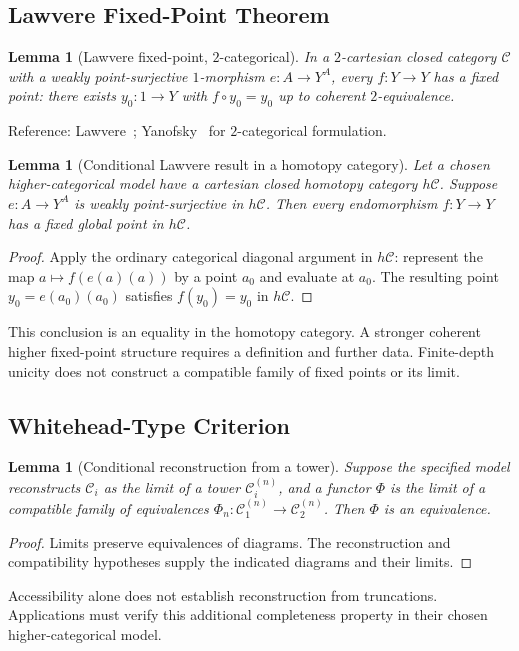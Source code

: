 \documentclass[11pt]{article}
\theoremstyle{plain}
\newtheorem{lemma}[theorem]{Lemma}
\theoremstyle{definition}
\newcommand{\cC}{\mathcal{C}}
\begin{document}
\subsection{Lawvere Fixed-Point Theorem}

\begin{lemma}[Lawvere fixed-point, $2$-categorical]\label{lem:lawvere-2}
In a $2$-cartesian closed category $\cC$ with a weakly point-surjective $1$-morphism $e : A \to Y^A$, every $f : Y \to Y$ has a fixed point: there exists $y_0 : 1 \to Y$ with $f \circ y_0 = y_0$ up to coherent $2$-equivalence.
\end{lemma}

Reference: Lawvere~\cite{Lawvere1969}; Yanofsky~\cite{Yanofsky2003} for $2$-categorical formulation.

\begin{lemma}[Conditional Lawvere result in a homotopy category]\label{lem:lawvere-inf}
Let a chosen higher-categorical model have a cartesian closed homotopy category $h\cC$. Suppose $e:A\to Y^A$ is weakly point-surjective in $h\cC$. Then every endomorphism $f:Y\to Y$ has a fixed global point in $h\cC$.
\end{lemma}
\begin{proof}
Apply the ordinary categorical diagonal argument in $h\cC$: represent the map $a\mapsto f(e(a)(a))$ by a point $a_0$ and evaluate at $a_0$. The resulting point $y_0=e(a_0)(a_0)$ satisfies $f(y_0)=y_0$ in $h\cC$.
\end{proof}
This conclusion is an equality in the homotopy category. A stronger coherent higher fixed-point structure requires a definition and further data. Finite-depth unicity does not construct a compatible family of fixed points or its limit.

\subsection{Whitehead-Type Criterion}

\begin{lemma}[Conditional reconstruction from a tower]\label{lem:whitehead}
Suppose the specified model reconstructs $\cC_i$ as the limit of a tower
$\cC_i^{(n)}$, and a functor $\Phi$ is the limit of a compatible family
of equivalences $\Phi_n:\cC_1^{(n)}\to\cC_2^{(n)}$. Then $\Phi$ is an
equivalence.
\end{lemma}
\begin{proof}
Limits preserve equivalences of diagrams. The reconstruction and
compatibility hypotheses supply the indicated diagrams and their limits.
\end{proof}
Accessibility alone does not establish reconstruction from truncations.
Applications must verify this additional completeness property in their
chosen higher-categorical model.
\end{document}
